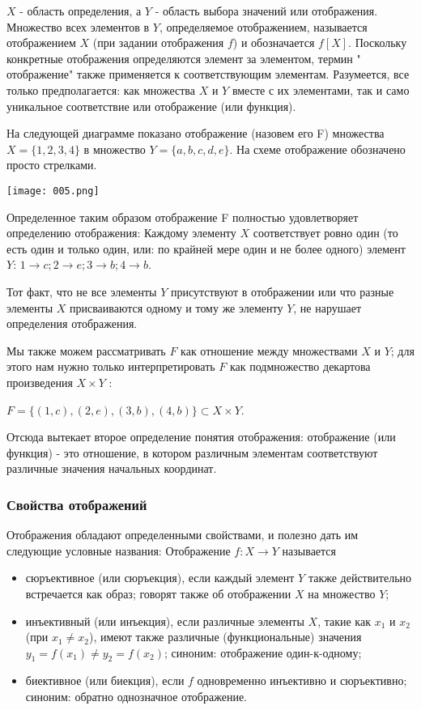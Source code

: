 \(X\) - область определения, а \(Y\) - область выбора значений или отображения. Множество всех элементов в \(Y\), определяемое отображением, называется отображением \(X\) (при задании отображения \(f\)) и обозначается \(f[X]\).
Поскольку конкретные отображения определяются элемент за элементом, термин " отображение" также применяется к соответствующим элементам. Разумеется, все только предполагается: как множества \(X\) и \(Y\) вместе с их элементами, так и само уникальное соответствие или отображение (или функция).

На следующей диаграмме показано отображение (назовем его F) множества \(X=\{1,2,3,4\}\) в множество \(Y=\{a,b,c,d,e\}\). На схеме отображение обозначено просто стрелками.
\begin{center}
  \texttt{[image: 005.png]}
\end{center}

Определенное таким образом отображение F полностью удовлетворяет определению отображения:  Каждому элементу \(X\) соответствует ровно один (то есть один и только один, или: по крайней мере один и не более одного) элемент \(Y\): \(1 \rightarrow c ; 2 \rightarrow e ; 3 \rightarrow b ; 4 \rightarrow b\).

Тот факт, что не все элементы \(Y\) присутствуют в отображении или что разные элементы \(X\) присваиваются одному и тому же элементу \(Y\), не нарушает определения отображения.

Мы также можем рассматривать \(F\) как отношение между множествами \(X\) и \(Y\); для этого нам нужно только интерпретировать \(F\) как подмножество декартова произведения \(X \times Y\) :

\vspace{0.5cm}
\(F=\{(1,c),(2,e),(3,b),(4,b)\} \subset X \times Y\).

\vspace{0.5cm}

Отсюда вытекает второе определение понятия отображения: отображение (или функция) - это отношение, в котором различным элементам соответствуют различные значения начальных координат.

\subsubsection{Свойства отображений}
Отображения обладают определенными свойствами, и полезно дать им следующие условные названия: Отображение \(f: X \rightarrow Y\) называется
\begin{itemize}
  \item сюръективное (или сюръекция), если каждый элемент \(Y\) также действительно встречается как образ; говорят также об отображении \(X\) на множество \(Y\);
  \item инъективный (или инъекция), если различные элементы \(X\), такие как \(x_1\) и \(x_2\) (при \(x_1 \neq x_2\)), имеют также различные (функциональные) значения \(y_1 = f(x_1) \neq y_2 = f(x_2) \); синоним: отображение один-к-одному;
  \item биективное (или биекция), если \(f\) одновременно инъективно и сюръективно; синоним: обратно однозначное отображение.
\end{itemize}

